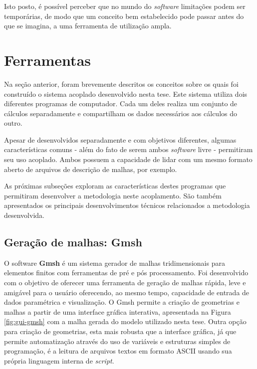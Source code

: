 Isto posto, é possível perceber que no mundo do \textit{software} limitações podem ser temporárias, de modo que um
conceito bem estabelecido pode passar antes do que se imagina, a uma ferramenta de utilização ampla.

\section{Ferramentas}
\label{sec:ferr}

Na seção anterior, foram brevemente descritos os conceitos sobre os quais foi construído
o sistema acoplado desenvolvido nesta tese. Este
sistema utiliza dois diferentes programas de computador. Cada um deles
realiza um conjunto de cálculos separadamente e compartilham os dados necessários aos cálculos do outro.

Apesar de desenvolvidos separadamente e com objetivos diferentes, algumas características comuns - além
do fato de serem ambos \textit{software} livre - permitiram seu uso acoplado. Ambos possuem a capacidade de lidar
com um mesmo formato aberto de arquivos de descrição de malhas, por exemplo.


As próximas subseções exploram as características destes programas que permitiram desenvolver
a metodologia neste acoplamento. São também apresentados os principais desenvolvimentos técnicos
relacionados a metodologia desenvolvida.

\subsection{Geração de malhas: \textbf{Gmsh}}
\label{subsection:gmsh}

O software \textbf{Gmsh} \cite{Geuzane2009} é um sistema gerador de malhas tridimensionais
para elementos finitos com ferramentas de pré e pós processamento. Foi desenvolvido com o objetivo
de oferecer uma ferramenta de geração de malhas rápida, leve e amigável para o usuário oferecendo,
ao mesmo tempo, capacidade de entrada de dados paramétrica e visualização. O Gmsh permite
a criação de geometrias e malhas a partir de uma interface gráfica interativa, apresentada
na Figura \ref{fig:gui-gmsh} com a malha gerada do modelo utilizado nesta tese. Outra opção
para criação de geometrias, esta mais robusta que a interface gráfica, já que permite
automatização através do uso de variáveis e estruturas simples de programação, é a leitura
de arquivos textos em formato ASCII usando sua própria linguagem interna de \textit{script}.


